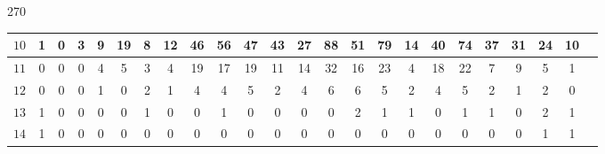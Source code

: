 \documentclass[12pt]{book}
\theoremstyle{definition}
\newcounter{in}
\begin{document}
\begin{table}[t]
\begin{turn}{270}
\begin{tabular}{| c | c | c | c | c | c | c | c | c |  c | c | c | c | c | c | c | c | c | c | c | c | c | c | c | }
$10$ & 1 & 0 & 3 & 9 & 19 & 8 & 12 & 46 & 56 & 47 & 43 & 27 & 88 & 51 & 79 & 14 & 40 & 74 & 37 & 31 & 24 & 10 \\ \hline
$11$ & 0 & 0 & 0 & 4 & 5 & 3 & 4 & 19 & 17 & 19 & 11 & 14 & 32 & 16 & 23 & 4 & 18 & 22 & 7 & 9 & 5 & 1 \\ \hline
$12$ & 0 & 0 & 0 & 1 & 0 & 2 & 1 & 4 & 4 & 5 & 2 & 4 & 6 & 6 & 5 & 2 & 4 & 5 & 2 & 1 & 2 & 0 \\ \hline
$13$ & 1 & 0 & 0 & 0 & 0 & 1 & 0 & 0 & 1 & 0 & 0 & 0 & 0 & 2 & 1 & 1 & 0 & 1 & 1 & 0 & 2 & 1 \\ \hline
$14$ & 1 & 0 & 0 & 0 & 0 & 0 & 0 & 0 & 0 & 0 & 0 & 0 & 0 & 0 & 0 & 0 & 0 & 0 & 0 & 0 & 1 & 1 \\ \hline

\end{tabular}
\end{turn}
\end{table}


\backmatter




\printindex
\end{document}
